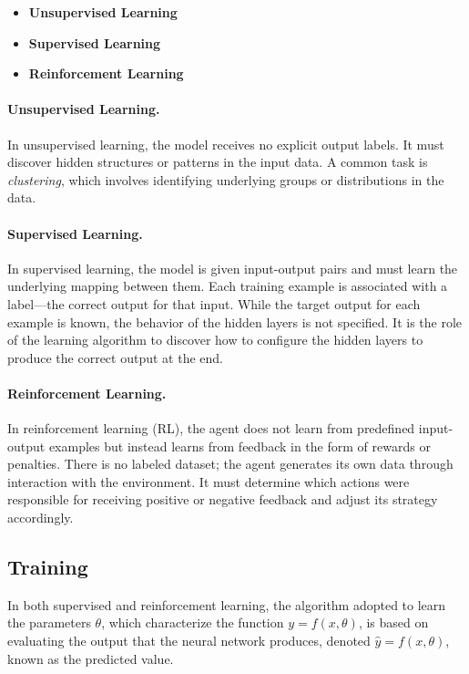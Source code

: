 \documentclass[a4paper,oneside]{book}
\theoremstyle{definition}
\begin{document}
\begin{itemize}
    \item \textbf{Unsupervised Learning}
    \item \textbf{Supervised Learning}
    \item \textbf{Reinforcement Learning}
\end{itemize}

\paragraph{Unsupervised Learning.}
In unsupervised learning, the model receives no explicit output labels. It must discover hidden structures or patterns in the input data. A common task is \textit{clustering}, which involves identifying underlying groups or distributions in the data.

\paragraph{Supervised Learning.}
In supervised learning, the model is given input-output pairs and must learn the underlying mapping between them. Each training example is associated with a label—the correct output for that input. While the target output for each example is known, the behavior of the hidden layers is not specified. It is the role of the learning algorithm to discover how to configure the hidden layers to produce the correct output at the end.

\paragraph{Reinforcement Learning.}
In reinforcement learning (RL), the agent does not learn from predefined input-output examples but instead learns from feedback in the form of rewards or penalties. There is no labeled dataset; the agent generates its own data through interaction with the environment. It must determine which actions were responsible for receiving positive or negative feedback and adjust its strategy accordingly.

\subsection{Training}
In both supervised and reinforcement learning, the algorithm adopted to learn the parameters \( \theta \), which characterize the function \( y = f(x, \theta) \), is based on evaluating the output that the neural network produces, denoted \( \hat{y} = f(x, \theta) \), known as the predicted value.
\end{document}
